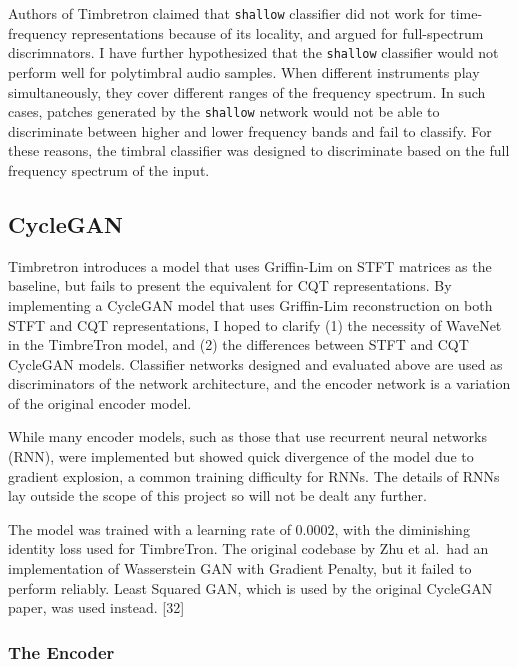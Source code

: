 \documentclass[12pt,a4paper,]{report}
\begin{document}
Authors of Timbretron claimed that \texttt{shallow} classifier did not
work for time-frequency representations because of its locality, and
argued for full-spectrum discrimnators. I have further hypothesized that
the \texttt{shallow} classifier would not perform well for polytimbral
audio samples. When different instruments play simultaneously, they
cover different ranges of the frequency spectrum. In such cases, patches
generated by the \texttt{shallow} network would not be able to
discriminate between higher and lower frequency bands and fail to
classify. For these reasons, the timbral classifier was designed to
discriminate based on the full frequency spectrum of the input.

\hypertarget{cyclegan-1}{%
\subsection{CycleGAN}\label{cyclegan-1}}

Timbretron introduces a model that uses Griffin-Lim on STFT matrices as
the baseline, but fails to present the equivalent for CQT
representations. By implementing a CycleGAN model that uses Griffin-Lim
reconstruction on both STFT and CQT representations, I hoped to clarify
(1) the necessity of WaveNet in the TimbreTron model, and (2) the
differences between STFT and CQT CycleGAN models. Classifier networks
designed and evaluated above are used as discriminators of the network
architecture, and the encoder network is a variation of the original
encoder model.

While many encoder models, such as those that use recurrent neural
networks (RNN), were implemented but showed quick divergence of the
model due to gradient explosion, a common training difficulty for RNNs.
The details of RNNs lay outside the scope of this project so will not be
dealt any further.

The model was trained with a learning rate of 0.0002, with the
diminishing identity loss used for TimbreTron. The original codebase by
Zhu et al.~had an implementation of Wasserstein GAN with Gradient
Penalty, but it failed to perform reliably. Least Squared GAN, which is
used by the original CycleGAN paper, was used instead. {[}32{]}

\hypertarget{the-encoder}{%
\subsubsection{The Encoder}\label{the-encoder}}
\end{document}
